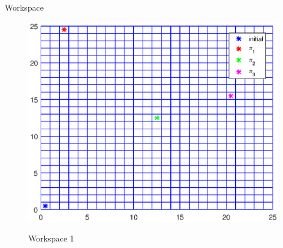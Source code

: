 \documentclass{beamer}
\begin{document}
\begin{frame}{Workspace}
\begin{figure}[!htb]
\centering
\includegraphics[scale=0.7]{workspace2.eps}
\label{fig:workspace}
\caption{Workspace 1}
\end{figure}
\end{frame}
\end{document}
